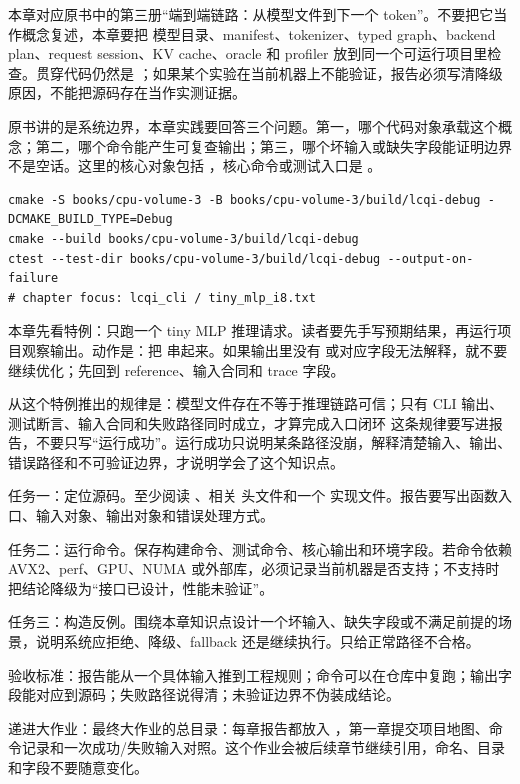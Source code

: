 
本章对应原书中的第三册“端到端链路：从模型文件到下一个 token”。不要把它当作概念复述，本章要把 模型目录、manifest、tokenizer、typed graph、backend plan、request session、KV cache、oracle 和 profiler 放到同一个可运行项目里检查。贯穿代码仍然是 ；如果某个实验在当前机器上不能验证，报告必须写清降级原因，不能把源码存在当作实测证据。


原书讲的是系统边界，本章实践要回答三个问题。第一，哪个代码对象承载这个概念；第二，哪个命令能产生可复查输出；第三，哪个坏输入或缺失字段能证明边界不是空话。这里的核心对象包括 ，核心命令或测试入口是 。

\begin{lstlisting}[numbers=none,caption={第 1 章实践：端到端推理链路与项目总入口 的最小命令入口}]
cmake -S books/cpu-volume-3 -B books/cpu-volume-3/build/lcqi-debug -DCMAKE_BUILD_TYPE=Debug
cmake --build books/cpu-volume-3/build/lcqi-debug
ctest --test-dir books/cpu-volume-3/build/lcqi-debug --output-on-failure
# chapter focus: lcqi_cli / tiny_mlp_i8.txt
\end{lstlisting}


本章先看特例：只跑一个 tiny MLP 推理请求。读者要先手写预期结果，再运行项目观察输出。动作是：把  串起来。如果输出里没有  或对应字段无法解释，就不要继续优化；先回到 reference、输入合同和 trace 字段。

从这个特例推出的规律是：模型文件存在不等于推理链路可信；只有 CLI 输出、测试断言、输入合同和失败路径同时成立，才算完成入口闭环 这条规律要写进报告，不要只写“运行成功”。运行成功只说明某条路径没崩，解释清楚输入、输出、错误路径和不可验证边界，才说明学会了这个知识点。


任务一：定位源码。至少阅读 、相关  头文件和一个  实现文件。报告要写出函数入口、输入对象、输出对象和错误处理方式。

任务二：运行命令。保存构建命令、测试命令、核心输出和环境字段。若命令依赖 AVX2、perf、GPU、NUMA 或外部库，必须记录当前机器是否支持；不支持时把结论降级为“接口已设计，性能未验证”。

任务三：构造反例。围绕本章知识点设计一个坏输入、缺失字段或不满足前提的场景，说明系统应拒绝、降级、fallback 还是继续执行。只给正常路径不合格。


验收标准：报告能从一个具体输入推到工程规则；命令可以在仓库中复跑；输出字段能对应到源码；失败路径说得清；未验证边界不伪装成结论。

递进大作业：最终大作业的总目录：每章报告都放入 ，第一章提交项目地图、命令记录和一次成功/失败输入对照。这个作业会被后续章节继续引用，命名、目录和字段不要随意变化。
